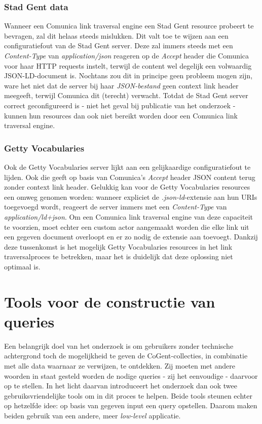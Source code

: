 \documentclass[conference]{IEEEtran}
\begin{document}
\subsubsection{Stad Gent data}
Wanneer een Comunica link traversal engine een Stad Gent resource probeert te bevragen, zal dit helaas steeds mislukken. Dit valt toe te wijzen aan een configuratiefout van de Stad Gent server. Deze zal immers steeds met een \textit{Content-Type} van \textit{application/json} reageren op de \textit{Accept} header die Comunica voor haar HTTP requests instelt, terwijl de content wel degelijk een volwaardig JSON-LD-document is. Nochtans zou dit in principe geen probleem mogen zijn, ware het niet dat de server bij haar \textit{JSON-bestand} geen context link header meegeeft, terwijl Comunica dit (terecht) verwacht. Totdat de Stad Gent server correct geconfigureerd is - niet het geval bij publicatie van het onderzoek - kunnen hun resources dan ook niet bereikt worden door een Comunica link traversal engine.

\subsubsection{Getty Vocabularies}
Ook de Getty Vocabularies server lijkt aan een gelijkaardige configuratiefout te lijden. Ook die geeft op basis van Comunica's \textit{Accept} header JSON content terug zonder context link header. Gelukkig kan voor de Getty Vocabularies resources een omweg genomen worden: wanneer expliciet de \textit{.json-ld}-extensie aan hun URIs toegevoegd wordt, reageert de server immers met een \textit{Content-Type} van \textit{application/ld+json}. Om een Comunica link traversal engine van deze capaciteit te voorzien, moet echter een custom actor aangemaakt worden die elke link uit een gegeven document overloopt en er zo nodig de extensie aan toevoegt. Dankzij deze tussenkomst is het mogelijk Getty Vocabularies resources in het link traversalproces te betrekken, maar het is duidelijk dat deze oplossing niet optimaal is.

\section{Tools voor de constructie van queries}
Een belangrijk doel van het onderzoek is om gebruikers zonder technische achtergrond toch de mogelijkheid te geven de CoGent-collecties, in combinatie met alle data waarnaar ze verwijzen, te ontdekken. Zij moeten met andere woorden in staat gesteld worden de nodige queries - zij het eenvoudige - daarvoor op te stellen. In het licht daarvan introduceert het onderzoek dan ook twee gebruiksvriendelijke tools om in dit proces te helpen. Beide tools steunen echter op hetzelfde idee: op basis van gegeven input een query opstellen. Daarom maken beiden gebruik van een andere, meer \textit{low-level} applicatie.
\end{document}
